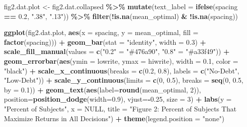 \documentclass[
]{article}
\newenvironment{Shaded}{\begin{snugshade}}{\end{snugshade}}
\newcommand{\AttributeTok}[1]{\textcolor[rgb]{0.13,0.29,0.53}{#1}}
\newcommand{\ConstantTok}[1]{\textcolor[rgb]{0.56,0.35,0.01}{#1}}
\newcommand{\DecValTok}[1]{\textcolor[rgb]{0.00,0.00,0.81}{#1}}
\newcommand{\FloatTok}[1]{\textcolor[rgb]{0.00,0.00,0.81}{#1}}
\newcommand{\FunctionTok}[1]{\textcolor[rgb]{0.13,0.29,0.53}{\textbf{#1}}}
\newcommand{\NormalTok}[1]{#1}
\newcommand{\OtherTok}[1]{\textcolor[rgb]{0.56,0.35,0.01}{#1}}
\newcommand{\SpecialCharTok}[1]{\textcolor[rgb]{0.81,0.36,0.00}{\textbf{#1}}}
\newcommand{\StringTok}[1]{\textcolor[rgb]{0.31,0.60,0.02}{#1}}
\begin{document}
\begin{Shaded}
\begin{Highlighting}[]
\NormalTok{fig2.dat.plot }\OtherTok{\textless{}{-}}\NormalTok{ fig2.dat.collapsed }\SpecialCharTok{\%\textgreater{}\%}
  \FunctionTok{mutate}\NormalTok{(}\AttributeTok{text\_label =} \FunctionTok{ifelse}\NormalTok{(spacing }\SpecialCharTok{==} \FloatTok{0.2}\NormalTok{, }\StringTok{".38"}\NormalTok{, }\StringTok{".13"}\NormalTok{)) }\SpecialCharTok{\%\textgreater{}\%}
  \FunctionTok{filter}\NormalTok{(}\SpecialCharTok{!}\FunctionTok{is.na}\NormalTok{(mean\_optimal) }\SpecialCharTok{\&} \SpecialCharTok{!}\FunctionTok{is.na}\NormalTok{(spacing))}

\FunctionTok{ggplot}\NormalTok{(fig2.dat.plot, }\FunctionTok{aes}\NormalTok{(}\AttributeTok{x =}\NormalTok{ spacing, }\AttributeTok{y =}\NormalTok{ mean\_optimal, }\AttributeTok{fill =} \FunctionTok{factor}\NormalTok{(spacing))) }\SpecialCharTok{+}
  \FunctionTok{geom\_bar}\NormalTok{(}\AttributeTok{stat =} \StringTok{"identity"}\NormalTok{, }\AttributeTok{width =} \FloatTok{0.3}\NormalTok{) }\SpecialCharTok{+}
  \FunctionTok{scale\_fill\_manual}\NormalTok{(}\AttributeTok{values =} \FunctionTok{c}\NormalTok{(}\StringTok{"0.2"} \OtherTok{=} \StringTok{"\#476a90"}\NormalTok{, }\StringTok{"0.8"} \OtherTok{=} \StringTok{"\#a33f49"}\NormalTok{)) }\SpecialCharTok{+}
  \FunctionTok{geom\_errorbar}\NormalTok{(}\FunctionTok{aes}\NormalTok{(}\AttributeTok{ymin =}\NormalTok{ lowrite, }\AttributeTok{ymax =}\NormalTok{ hiwrite), }\AttributeTok{width =} \FloatTok{0.1}\NormalTok{, }\AttributeTok{color =} \StringTok{"black"}\NormalTok{) }\SpecialCharTok{+}
  \FunctionTok{scale\_x\_continuous}\NormalTok{(}\AttributeTok{breaks =} \FunctionTok{c}\NormalTok{(}\FloatTok{0.2}\NormalTok{, }\FloatTok{0.8}\NormalTok{), }\AttributeTok{labels =} \FunctionTok{c}\NormalTok{(}\StringTok{"No{-}Debt"}\NormalTok{, }\StringTok{"Low{-}Debt"}\NormalTok{)) }\SpecialCharTok{+}
  \FunctionTok{scale\_y\_continuous}\NormalTok{(}\AttributeTok{limits =} \FunctionTok{c}\NormalTok{(}\DecValTok{0}\NormalTok{, }\FloatTok{0.5}\NormalTok{), }\AttributeTok{breaks =} \FunctionTok{seq}\NormalTok{(}\DecValTok{0}\NormalTok{, }\FloatTok{0.5}\NormalTok{, }\AttributeTok{by =} \FloatTok{0.1}\NormalTok{)) }\SpecialCharTok{+}
  \FunctionTok{geom\_text}\NormalTok{(}\FunctionTok{aes}\NormalTok{(}\AttributeTok{label=}\FunctionTok{round}\NormalTok{(mean\_optimal, }\DecValTok{2}\NormalTok{)), }\AttributeTok{position=}\FunctionTok{position\_dodge}\NormalTok{(}\AttributeTok{width=}\FloatTok{0.9}\NormalTok{), }\AttributeTok{vjust=}\SpecialCharTok{{-}}\FloatTok{0.25}\NormalTok{, }\AttributeTok{size =} \DecValTok{3}\NormalTok{) }\SpecialCharTok{+}
  \FunctionTok{labs}\NormalTok{(}\AttributeTok{y =} \StringTok{"Percent of Subjects"}\NormalTok{, }\AttributeTok{x =} \ConstantTok{NULL}\NormalTok{, }\AttributeTok{title =} \StringTok{"Figure 2: Percent of Subjects That Maximize Returns in All Decisions"}\NormalTok{) }\SpecialCharTok{+}
  \FunctionTok{theme}\NormalTok{(}\AttributeTok{legend.position =} \StringTok{"none"}\NormalTok{)}
\end{Highlighting}
\end{Shaded}
\end{document}
